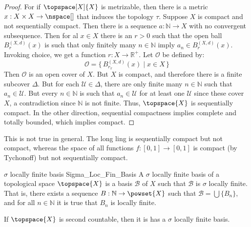 \documentclass{article}                                                        %
\begin{document}
        \begin{proof}
            For if $\topspace[X]{X}$ is metrizable, then there is a metric
            $x:X\times{X}\rightarrow\nspace[]$ that induces the topology $\tau$.
            Suppose $X$ is compact and not sequentially compact. Then there is a
            sequence $a:\mathbb{N}\rightarrow{X}$ with no convergent
            subsequence. Then for al $x\in{X}$ there is an $r>0$ such that the
            open ball $B_{r}^{(X,d)}(x)$ is such that only finitely many
            $n\in\mathbb{N}$ imply $a_{n}\in{B}_{r}^{(X,d)}(x)$. Invoking
            choice, we get a function $r:X\rightarrow\mathbb{R}^{+}$. Let
            $\mathcal{O}$ be defined by:
            \begin{equation}
                \mathcal{O}=\{\,B_{r_{x}}^{(X,d)}(x)\;|\;x\in{X}\,\}
            \end{equation}
            Then $\mathcal{O}$ is an open cover of $X$. But $X$ is compact, and
            therefore there is a finite subcover $\Delta$. But for each
            $\mathcal{U}\in\Delta$, there are only finite many
            $n\in\mathbb{N}$ such that $a_{n}\in\mathcal{U}$. But every
            $n\in\mathbb{N}$ is such that $a_{n}\in\mathcal{U}$ for at least
            one $\mathcal{U}$ since these cover $X$, a contradiction since
            $\mathbb{N}$ is not finite. Thus, $\topspace{X}$ is sequentially
            compact. In the other direction, sequential compactness implies
            complete and totally bounded, which implies compact.
        \end{proof}
        This is not true in general. The long ling is sequentially compact but
        not compact, whereas the space of all functions
        $f:[0,1]\rightarrow[0,1]$ is compact (by Tychonoff) but not sequentially
        compact.
        \begin{fdefinition}{$\sigma$ locally finite basis}
                           {Sigma_Loc_Fin_Basis}
            A $\sigma$ locally finite basis of a topological space
            $\topspace{X}$ is a basis $\mathcal{B}$ of $X$ such that
            $\mathcal{B}$ is $\sigma$ locally finite. That is, there exists
            a sequence $B:\mathbb{N}\rightarrow\powset{X}$ such that
            $\mathcal{B}=\bigcup\{B_{n}\}$, and for all $n\in\mathbb{N}$ it is
            true that $B_{n}$ is locally finite.
        \end{fdefinition}
        \begin{theorem}
            \label{thm:Second_Countable_Implies_Sigma_Loc_Fin_Basis}%
            If $\topspace{X}$ is second countable, then it is has a $\sigma$
            locally finite basis.
        \end{theorem}
\end{document}
